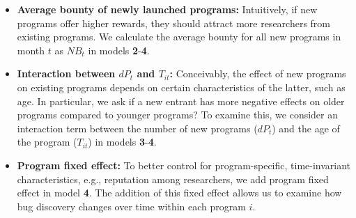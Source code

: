 \begin{itemize}
  \item \textbf{Average bounty of newly launched programs:} Intuitively, if new programs offer higher rewards, they should attract more researchers from existing programs. We calculate the average bounty for all new programs in month $t$ as $NB_t$ in models {\bf 2}-{\bf 4}.
  \item \textbf{Interaction between $dP_t$ and $T_{it}$:} Conceivably, the effect of new programs on existing programs depends on certain characteristics of the latter, such as age. In particular, we ask if a new entrant has more negative effects on older programs compared to younger programs? To examine this, we consider an interaction term between the number of new programs ($dP_t$) and the age of the program ($T_{it}$) in models {\bf 3}-{\bf 4}.
  \item \textbf{Program fixed effect:} To better control for program-specific, time-invariant characteristics, e.g., reputation among researchers, we add program fixed effect in model {\bf 4}. The addition of this fixed effect allows us to examine how bug discovery changes over time within each program $i$.
\end{itemize}


